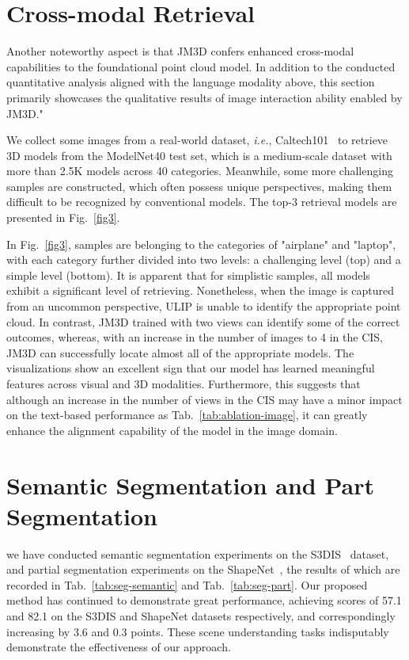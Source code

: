\documentclass[sigconf]{acmart}
\begin{document}
\section{Cross-modal Retrieval}\label{sec:cross-retrival}

Another noteworthy aspect is that JM3D confers enhanced cross-modal capabilities to the foundational point cloud model. In addition to the conducted quantitative analysis aligned with the language modality above, this section primarily showcases the qualitative results of image interaction ability enabled by JM3D."

We collect some images from a real-world dataset, \emph{i.e.}, Caltech101~\cite{fei2004learning} to retrieve 3D models from the ModelNet40 test set, which is a medium-scale dataset with more than 2.5K models across 40 categories. Meanwhile, some more challenging samples are constructed, which often possess unique perspectives, making them difficult to be recognized by conventional models. The top-3 retrieval models are presented in Fig.~\ref{fig3}.

In Fig.~\ref{fig3}, samples are belonging to the categories of "airplane" and "laptop", with each category further divided into two levels: a challenging level (top) and a simple level (bottom). It is apparent that for simplistic samples, all models exhibit a significant level of retrieving. Nonetheless, when the image is captured from an uncommon perspective, ULIP is unable to identify the appropriate point cloud. In contrast, JM3D trained with two views can identify some of the correct outcomes, whereas, with an increase in the number of images to 4 in the CIS, JM3D can successfully locate almost all of the appropriate models. The visualizations show an excellent sign that our model has learned meaningful features across visual and 3D modalities. Furthermore, this suggests that although an increase in the number of views in the CIS may have a minor impact on the text-based performance as Tab.~\ref{tab:ablation-image}, it can greatly enhance the alignment capability of the model in the image domain.

\section{Semantic Segmentation and Part Segmentation}

we have conducted semantic segmentation experiments on the S3DIS~\cite{armeni20163d} dataset, and partial segmentation experiments on the ShapeNet~\cite{chang2015shapenet}, the results of which are recorded in Tab.~\ref{tab:seg-semantic} and Tab.~\ref{tab:seg-part}. Our proposed method has continued to demonstrate great performance, achieving scores of 57.1 and 82.1 on the S3DIS and ShapeNet datasets respectively, and correspondingly increasing by 3.6 and 0.3 points. These scene understanding tasks indisputably demonstrate the effectiveness of our approach.
\end{document}
